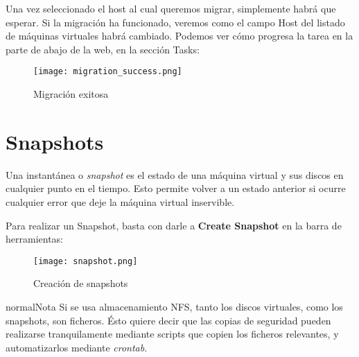 Una vez seleccionado el host al cual queremos migrar, simplemente habrá que esperar. Si la migración ha funcionado, veremos como el campo Host del listado de máquinas virtuales habrá cambiado. Podemos ver cómo progresa la tarea en la parte de abajo de la web, en la sección Tasks:

\begin{figure}[ht!]
  \centering
  \texttt{[image: migration\_success.png]}
  \caption{\label{fig:successful_migration} Migración exitosa}
\end{figure}

\section{Snapshots}
\label{sec:consola}

Una instantánea o \emph{snapshot} es el estado de una máquina virtual y sus discos en cualquier punto en el tiempo. Esto permite volver a un estado anterior si ocurre cualquier error que deje la máquina virtual inservible.

Para realizar un Snapshot, basta con darle a \textbf{Create Snapshot} en la barra de herramientas:

\begin{figure}[ht!]
  \centering
  \texttt{[image: snapshot.png]}
  \caption{\label{fig:snapshot} Creación de snapshots}
\end{figure}

\begin{TMbulletin}{normal}{Nota}
  Si se usa almacenamiento NFS, tanto los discos virtuales, como los snapshots, son ficheros. Ésto quiere decir que las copias de seguridad pueden realizarse tranquilamente mediante scripts que copien los ficheros relevantes, y automatizarlos mediante \emph{crontab}.
\end{TMbulletin}


